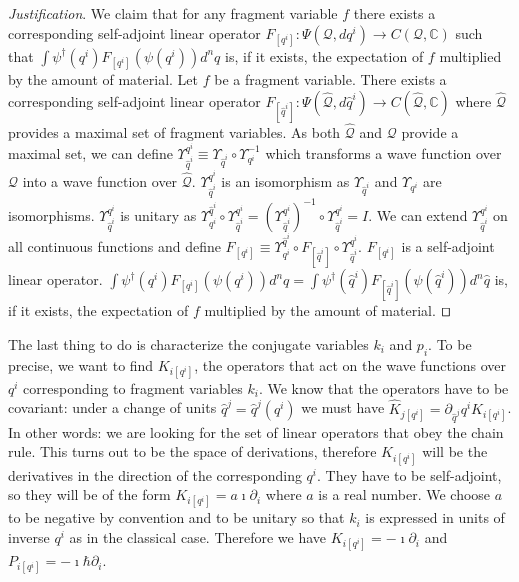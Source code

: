 \documentclass[smallextended]{svjour3}
\numberwithin{equation}{section}
\newenvironment{justification}{\emph{Justification}.}{\hfill\(\qed\)}
\theoremstyle{definition}
\newenvironment{justification}{\emph{Justification}.}{\qed}
\begin{document}
\begin{justification}
	We claim that for any fragment variable $f$ there exists a corresponding self-adjoint linear operator $F_{[q^i]} : \Psi(\mathcal{Q}, dq^i) \rightarrow C(\mathcal{Q}, \mathbb{C})$ such that $\int \psi^\dagger(q^i) F_{[q^i]}( \psi(q^i)) d^nq$ is, if it exists, the expectation of $f$ multiplied by the amount of material. Let $f$ be a fragment variable. There exists a corresponding self-adjoint linear operator $F_{[\hat{q}^i]} : \Psi(\hat{\mathcal{Q}}, d\hat{q}^i) \rightarrow C(\hat{\mathcal{Q}}, \mathbb{C})$ where $\hat{\mathcal{Q}}$ provides a maximal set of fragment variables. As both $\hat{\mathcal{Q}}$ and $\mathcal{Q}$ provide a maximal set, we can define $\Upsilon^{q^i}_{\hat{q}^i} \equiv \Upsilon_{\hat{q}^i} \circ \Upsilon_{q^i}^{-1}$ which transforms a wave function over $\mathcal{Q}$ into a wave function over $\hat{\mathcal{Q}}$. $\Upsilon^{q^i}_{\hat{q}^i}$ is an isomorphism as $\Upsilon_{\hat{q}^i}$ and $\Upsilon_{q^i}$ are isomorphisms. $\Upsilon^{q^i}_{\hat{q}^i}$ is unitary as $\Upsilon^{\hat{q}^i}_{q^i} \circ \Upsilon^{q^i}_{\hat{q}^i} = (\Upsilon^{q^i}_{\hat{q}^i})^{-1} \circ \Upsilon^{q^i}_{\hat{q}^i} = I$. We can extend $\Upsilon^{q^i}_{\hat{q}^i}$ on all continuous functions and define $F_{[q^i]} \equiv \Upsilon^{\hat{q}^i}_{q^i} \circ F_{[\hat{q}^i]} \circ \Upsilon^{q^i}_{\hat{q}^i}$. $F_{[q^i]}$ is a self-adjoint linear operator. $\int \psi^\dagger(q^i) F_{[q^i]}( \psi(q^i)) d^nq = \int \psi^\dagger(\hat{q}^i) F_{[\hat{q}^i]}( \psi(\hat{q}^i)) d^n \hat{q}$ is, if it exists, the expectation of $f$ multiplied by the amount of material.
\end{justification}

The last thing to do is characterize the conjugate variables $k_i$ and $p_i$. To be precise, we want to find $K_{i [q^i]}$, the operators that act on the wave functions over $q^i$ corresponding to fragment variables $k_i$. We know that the operators have to be covariant: under a change of units $\hat{q}^j = \hat{q}^j(q^i)$ we must have $\hat{K}_{j[q^i]} = \partial_{\hat{q}^j} q^i K_{i [q^i]}$. In other words: we are looking for the set of linear operators that obey the chain rule. This turns out to be the space of derivations, therefore $K_{i [q^i]}$ will be the derivatives in the direction of the corresponding $q^i$. They have to be self-adjoint, so they will be of the form $K_{i [q^i]} = a \imath \partial_{i}$ where $a$ is a real number. We choose $a$ to be negative by convention and to be unitary so that $k_i$ is expressed in units of inverse $q^i$ as in the classical case. Therefore we have $K_{i [q^i]} = -\imath \partial_i$ and $P_{i [q^i]} = -\imath \hbar \partial_i$.
\end{document}
